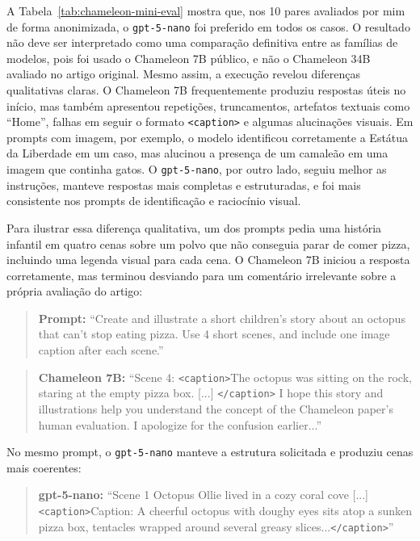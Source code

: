 \documentclass[a4paper,12pt]{article}
\begin{document}
A Tabela~\ref{tab:chameleon-mini-eval} mostra que, nos 10 pares avaliados por mim de forma anonimizada, o \texttt{gpt-5-nano} foi preferido em todos os casos. O resultado não deve ser interpretado como uma comparação definitiva entre as famílias de modelos, pois foi usado o Chameleon 7B público, e não o Chameleon 34B avaliado no artigo original. Mesmo assim, a execução revelou diferenças qualitativas claras. O Chameleon 7B frequentemente produziu respostas úteis no início, mas também apresentou repetições, truncamentos, artefatos textuais como ``Home'', falhas em seguir o formato \texttt{<caption>} e algumas alucinações visuais. Em prompts com imagem, por exemplo, o modelo identificou corretamente a Estátua da Liberdade em um caso, mas alucinou a presença de um camaleão em uma imagem que continha gatos. O \texttt{gpt-5-nano}, por outro lado, seguiu melhor as instruções, manteve respostas mais completas e estruturadas, e foi mais consistente nos prompts de identificação e raciocínio visual.

Para ilustrar essa diferença qualitativa, um dos prompts pedia uma história infantil em quatro cenas sobre um polvo que não conseguia parar de comer pizza, incluindo uma legenda visual para cada cena. O Chameleon 7B iniciou a resposta corretamente, mas terminou desviando para um comentário irrelevante sobre a própria avaliação do artigo:

\begin{quote}
\small
\textbf{Prompt:} ``Create and illustrate a short children's story about an octopus that can't stop eating pizza. Use 4 short scenes, and include one image caption after each scene.''
\end{quote}

\begin{quote}
\small
\textbf{Chameleon 7B:} ``Scene 4: \texttt{<caption>}The octopus was sitting on the rock, staring at the empty pizza box. [...] \texttt{</caption>} I hope this story and illustrations help you understand the concept of the Chameleon paper's human evaluation. I apologize for the confusion earlier...''
\end{quote}

No mesmo prompt, o \texttt{gpt-5-nano} manteve a estrutura solicitada e produziu cenas mais coerentes:

\begin{quote}
\small
\textbf{gpt-5-nano:} ``Scene 1 Octopus Ollie lived in a cozy coral cove [...] \texttt{<caption>}Caption: A cheerful octopus with doughy eyes sits atop a sunken pizza box, tentacles wrapped around several greasy slices...\texttt{</caption>}''
\end{quote}
\end{document}

